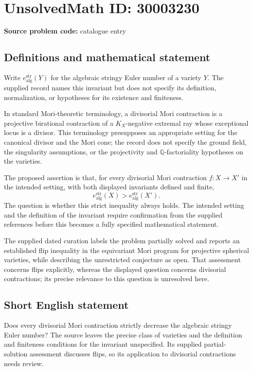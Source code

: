 \documentclass[11pt]{article}
\begin{document}
\section*{UnsolvedMath ID: 30003230}
\textbf{Source problem code:} catalogue entry
\subsection{Definitions and mathematical statement}
Write \(e_{\mathrm{alg}}^{\mathrm{str}}(Y)\) for the algebraic stringy Euler number of a variety \(Y\). The supplied record names this invariant but does not specify its definition, normalization, or hypotheses for its existence and finiteness.

In standard Mori-theoretic terminology, a divisorial Mori contraction is a projective birational contraction of a \(K_X\)-negative extremal ray whose exceptional locus is a divisor. This terminology presupposes an appropriate setting for the canonical divisor and the Mori cone; the record does not specify the ground field, the singularity assumptions, or the projectivity and \(\mathbb Q\)-factoriality hypotheses on the varieties.

The proposed assertion is that, for every divisorial Mori contraction \(f\colon X\to X'\) in the intended setting, with both displayed invariants defined and finite,
\[
 e_{\mathrm{alg}}^{\mathrm{str}}(X)
 >
 e_{\mathrm{alg}}^{\mathrm{str}}(X').
\]
The question is whether this strict inequality always holds. The intended setting and the definition of the invariant require confirmation from the supplied references before this becomes a fully specified mathematical statement.

The supplied dated curation labels the problem partially solved and reports an established flip inequality in the equivariant Mori program for projective spherical varieties, while describing the unrestricted conjecture as open. That assessment concerns flips explicitly, whereas the displayed question concerns divisorial contractions; its precise relevance to this question is unresolved here.
\subsection{Short English statement}
Does every divisorial Mori contraction strictly decrease the algebraic stringy Euler number? The source leaves the precise class of varieties and the definition and finiteness conditions for the invariant unspecified. Its supplied partial-solution assessment discusses flips, so its application to divisorial contractions needs review.
\end{document}
